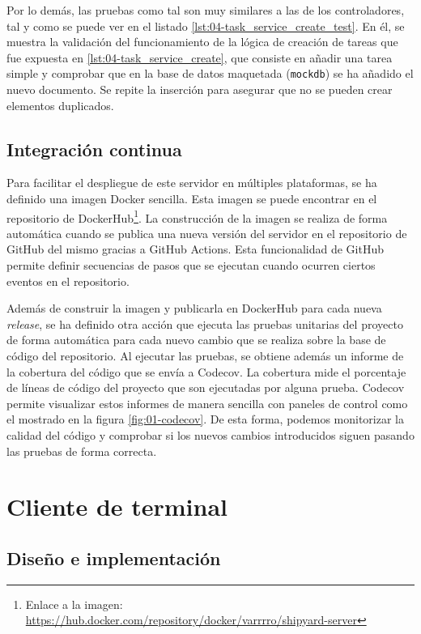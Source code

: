 Por lo demás, las pruebas como tal son muy similares a las de los controladores,
tal y como se puede ver en el listado \ref{lst:04-task_service_create_test}. En
él, se muestra la validación del funcionamiento de la lógica de creación de
tareas que fue expuesta en \ref{lst:04-task_service_create}, que consiste en
añadir una tarea simple y comprobar que en la base de datos maquetada
(\texttt{mockdb}) se ha añadido el nuevo documento. Se repite la inserción para
asegurar que no se pueden crear elementos duplicados.

\subsection{Integración continua}

Para facilitar el despliegue de este servidor en múltiples plataformas, se ha
definido una imagen Docker sencilla. Esta imagen se puede encontrar en el
repositorio de DockerHub\footnote{Enlace a la imagen:
    \url{https://hub.docker.com/repository/docker/varrrro/shipyard-server}}. La
construcción de la imagen se realiza de forma automática cuando se publica una
nueva versión del servidor en el repositorio de GitHub del mismo gracias a
GitHub Actions. Esta funcionalidad de GitHub permite definir secuencias de pasos
que se ejecutan cuando ocurren ciertos eventos en el repositorio.

Además de construir la imagen y publicarla en DockerHub para cada nueva
\textit{release}, se ha definido otra acción que ejecuta las pruebas unitarias
del proyecto de forma automática para cada nuevo cambio que se realiza sobre la
base de código del repositorio. Al ejecutar las pruebas, se obtiene además un
informe de la cobertura del código que se envía a Codecov. La cobertura mide el
porcentaje de líneas de código del proyecto que son ejecutadas por alguna
prueba. Codecov permite visualizar estos informes de manera sencilla con paneles
de control como el mostrado en la figura \ref{fig:01-codecov}. De esta forma,
podemos monitorizar la calidad del código y comprobar si los nuevos cambios
introducidos siguen pasando las pruebas de forma correcta.

\section{Cliente de terminal}

\subsection{Diseño e implementación}

